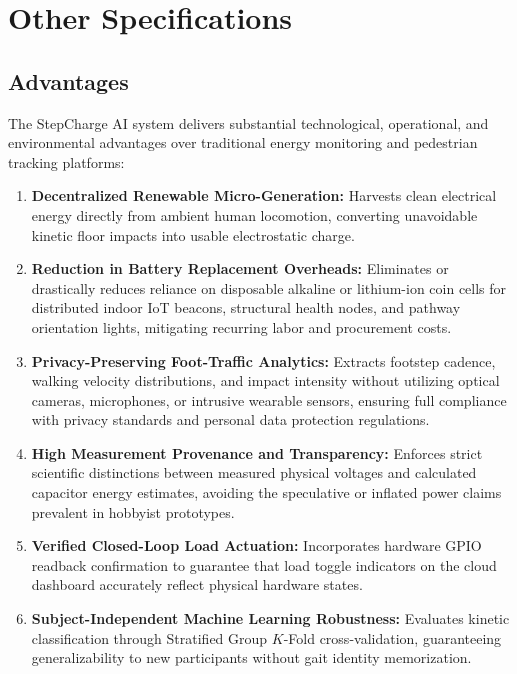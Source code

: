 \chapter{Other Specifications}

\section{Advantages}
The StepCharge AI system delivers substantial technological, operational, and environmental advantages over traditional energy monitoring and pedestrian tracking platforms:
\begin{enumerate}[itemsep=2pt,parsep=1pt,topsep=3pt]
    \item \textbf{Decentralized Renewable Micro-Generation:} Harvests clean electrical energy directly from ambient human locomotion, converting unavoidable kinetic floor impacts into usable electrostatic charge.
    \item \textbf{Reduction in Battery Replacement Overheads:} Eliminates or drastically reduces reliance on disposable alkaline or lithium-ion coin cells for distributed indoor IoT beacons, structural health nodes, and pathway orientation lights, mitigating recurring labor and procurement costs.
    \item \textbf{Privacy-Preserving Foot-Traffic Analytics:} Extracts footstep cadence, walking velocity distributions, and impact intensity without utilizing optical cameras, microphones, or intrusive wearable sensors, ensuring full compliance with privacy standards and personal data protection regulations.
    \item \textbf{High Measurement Provenance and Transparency:} Enforces strict scientific distinctions between measured physical voltages and calculated capacitor energy estimates, avoiding the speculative or inflated power claims prevalent in hobbyist prototypes.
    \item \textbf{Verified Closed-Loop Load Actuation:} Incorporates hardware GPIO readback confirmation to guarantee that load toggle indicators on the cloud dashboard accurately reflect physical hardware states.
    \item \textbf{Subject-Independent Machine Learning Robustness:} Evaluates kinetic classification through Stratified Group $K$-Fold cross-validation, guaranteeing generalizability to new participants without gait identity memorization.
\end{enumerate}


